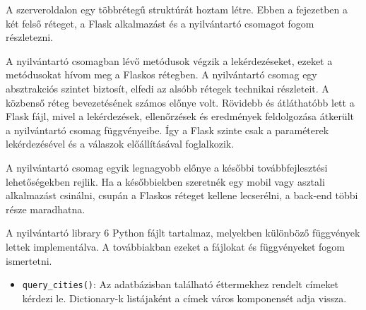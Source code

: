 
A szerveroldalon egy többrétegű struktúrát hoztam létre. Ebben a fejezetben a két felső réteget, a Flask alkalmazást és a nyilvántartó csomagot fogom részletezni.


A nyilvántartó csomagban lévő metódusok végzik a lekérdezéseket, ezeket a metódusokat hívom meg a Flaskos rétegben. A nyilvántartó csomag egy absztrakciós szintet biztosít, elfedi az alsóbb rétegek technikai részleteit. A közbenső réteg bevezetésének számos előnye volt. Rövidebb és átláthatóbb lett a Flask fájl, mivel a lekérdezések, ellenőrzések és eredmények feldolgozása átkerült a nyilvántartó csomag függvényeibe. Így a Flask szinte csak a paraméterek lekérdezésével és a válaszok előállításával foglalkozik.

A nyilvántartó csomag egyik legnagyobb előnye a későbbi továbbfejlesztési lehetőségekben rejlik. Ha a későbbiekben szeretnék egy mobil vagy asztali alkalmazást csinálni, csupán a Flaskos réteget kellene lecserélni, a back-end többi része maradhatna.

A nyilvántartó library 6 Python fájlt tartalmaz, melyekben különböző függvények lettek implementálva. A továbbiakban ezeket a fájlokat és függvényeket fogom ismertetni.


\begin{itemize}
    \item \texttt{query\_cities()}: Az adatbázisban található éttermekhez rendelt címeket kérdezi le. Dictionary-k listájaként a címek város komponensét adja vissza.
\end{itemize}


